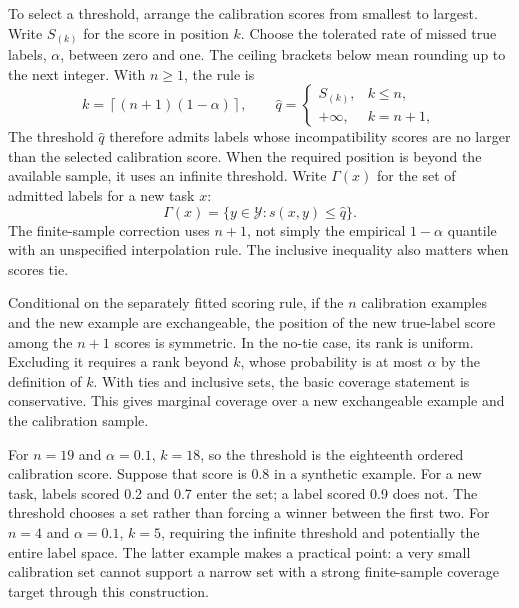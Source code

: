To select a threshold, arrange the calibration scores from smallest to largest.
Write $S_{(k)}$ for the score in position $k$. Choose the tolerated rate of missed
true labels, $\alpha$, between zero and one. The ceiling brackets below mean
rounding up to the next integer. With $n\geq1$, the rule is
\begin{equation}
 k=\left\lceil(n+1)(1-\alpha)\right\rceil,
 \qquad
 \widehat q=\begin{cases}
 S_{(k)},&k\leq n,\\
 +\infty,&k=n+1,
 \end{cases}
 \label{eq:conformal-quantile}
\end{equation}
The threshold $\widehat q$ therefore admits labels whose incompatibility scores
are no larger than the selected calibration score. When the required position is
beyond the available sample, it uses an infinite threshold. Write $\Gamma(x)$
for the set of admitted labels for a new task $x$:
\begin{equation}
 \Gamma(x)=\{y\in\mathcal Y:s(x,y)\leq\widehat q\}.
 \label{eq:conformal-set}
\end{equation}
The finite-sample correction uses $n+1$, not simply the empirical $1-\alpha$
quantile with an unspecified interpolation rule. The inclusive inequality also
matters when scores tie.

Conditional on the separately fitted scoring rule, if the
$n$ calibration examples and the new example are exchangeable, the position of
the new true-label score among the $n+1$ scores is symmetric. In the no-tie case,
its rank is uniform. Excluding it requires a rank beyond $k$, whose probability
is at most $\alpha$ by the definition of $k$. With ties and inclusive sets, the
basic coverage statement is conservative. This gives marginal coverage over a
new exchangeable example and the calibration sample.


For $n=19$ and $\alpha=0.1$, $k=18$, so the threshold is the eighteenth ordered
calibration score. Suppose that score is 0.8 in a synthetic example. For a new
task, labels scored 0.2 and 0.7 enter the set; a label scored 0.9 does not. The
threshold chooses a set rather than forcing a winner between the first two.
For $n=4$ and $\alpha=0.1$, $k=5$, requiring the infinite
threshold and potentially the entire label space. The latter example makes a
practical point: a very small calibration set cannot support a narrow set with a
strong finite-sample coverage target through this construction.

